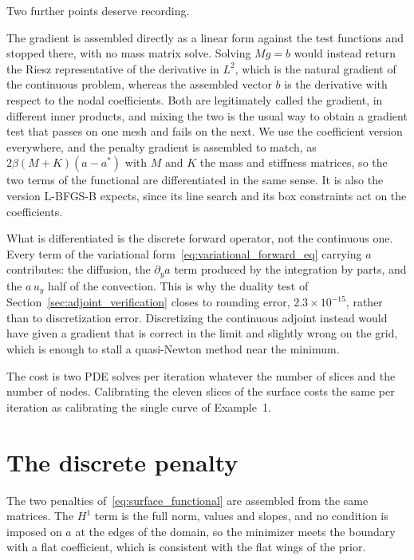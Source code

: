 Two further points deserve recording.

The gradient is assembled directly as a linear form against the test functions and stopped
there, with no mass matrix solve. Solving $M g = b$ would instead return the Riesz
representative of the derivative in $L^2$, which is the natural gradient of the continuous
problem, whereas the assembled vector $b$ is the derivative with respect to the nodal
coefficients. Both are legitimately called the gradient, in different inner products, and
mixing the two is the usual way to obtain a gradient test that passes on one mesh and fails on
the next. We use the coefficient version everywhere, and the penalty gradient is assembled to
match, as $2\beta(M + K)(a - a^*)$ with $M$ and $K$ the mass and stiffness matrices, so the
two terms of the functional are differentiated in the same sense. It is also the version
L-BFGS-B expects, since its line search and its box constraints act on the coefficients.

What is differentiated is the discrete forward operator, not the continuous one. Every term of
the variational form~\eqref{eq:variational_forward_eq} carrying $a$ contributes: the diffusion,
the $\partial_y a$ term produced by the integration by parts, and the $a\,u_y$ half of the
convection. This is why the duality test of Section~\ref{sec:adjoint_verification} closes to
rounding error, $2.3\times 10^{-15}$, rather than to discretization error. Discretizing the
continuous adjoint instead would have given a gradient that is correct in the limit and
slightly wrong on the grid, which is enough to stall a quasi-Newton method near the minimum.

The cost is two PDE solves per iteration whatever the number of slices and the number of
nodes. Calibrating the eleven slices of the surface costs the same per iteration as
calibrating the single curve of Example~1.

\section{The discrete penalty}
\label{subsec:penalty_details}

The two penalties of~\eqref{eq:surface_functional} are assembled from the same matrices. The
$H^1$ term is the full norm, values and slopes, and no condition is imposed on $a$ at the edges
of the domain, so the minimizer meets the boundary with a flat coefficient, which is consistent
with the flat wings of the prior.

